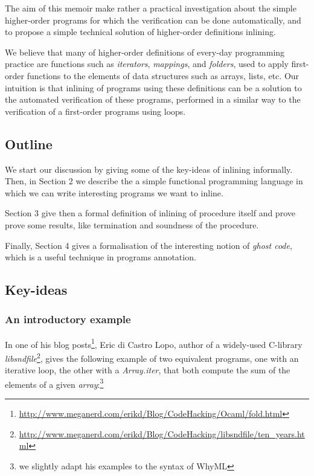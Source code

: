 \documentclass[a4paper,11pt,oneside]{article}
\theoremstyle{plain}
\newcommand{\meganerd}	
	{\url{http://www.meganerd.com/erikd/Blog/CodeHacking/Ocaml/fold.html}}
\newcommand{\libsndfile}
{\url{
http://www.meganerd.com/erikd/Blog/CodeHacking/libsndfile/ten_years.html}}
\begin{document}
 The aim of this memoir make rather a practical investigation about the simple higher-order programs for which the verification can be done automatically, and to propose a simple technical solution of higher-order definitions inlining. 
	
	We believe that many of higher-order definitions of every-day programming practice  
are functions such as \textit{iterators}, \textit{mappings}, and \textit{folders},
used to apply first-order functions to the elements
of data structures such as arrays, lists, etc.  
 Our intuition is that inlining of programs using these definitions can be a solution to the automated verification of these programs, performed in a similar way to the verification of a first-order programs using loops.	
	
	\subsection{Outline}	
	
  We start our discussion by giving some of the key-ideas of inlining informally.
  Then, in Section 2 we describe the a simple functional programming language in which we can write interesting programs we want to inline. 
   
	Section 3 give then a formal definition of inlining of procedure itself and prove 
	prove some results, like termination and soundness of the procedure. 

	Finally, Section 4 gives a formalisation of the interesting notion of \textit{ghost code}, which is a useful technique in programs annotation.
	 
 
  
	
\subsection{Key-ideas}		

\subsubsection*{An introductory example}			
	
	In one of his blog posts\footnote{\meganerd}, Eric di Castro Lopo, author of a widely-used C-library \textit{libsndfile}\footnote{\libsndfile}, gives the following example of two equivalent programs, one with an iterative loop, the other with a \textit{Array.iter}, that both compute the sum of the elements of a given \textit{array}:\vspace{-0.5cm}\footnote{we slightly adapt his examples to the syntax of WhyML} 
\end{document}

